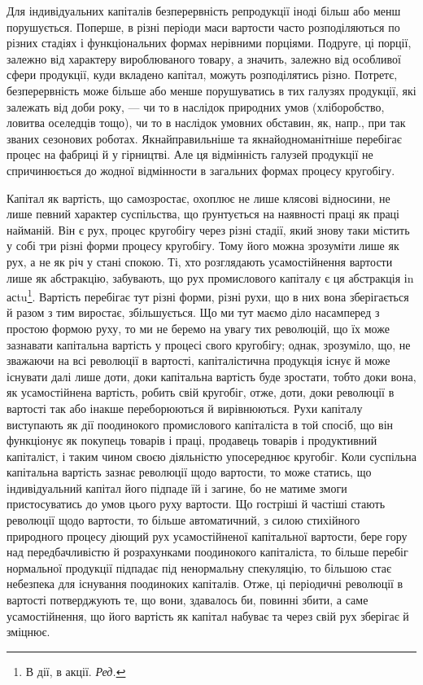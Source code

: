 
Для індивідуальних капіталів безперервність репродукції іноді більш
або менш порушується. Поперше, в різні періоди маси вартости часто
розподіляються по різних стадіях і функціональних формах нерівними
порціями. Подруге, ці порції, залежно від характеру вироблюваного товару,
а значить, залежно від особливої сфери продукції, куди вкладено капітал,
можуть розподілятись різно. Потретє, безперервність може більше або
менше порушуватись в тих галузях продукції, які залежать від доби
року, — чи то в наслідок природних умов (хліборобство, ловитва оселедців
тощо), чи то в наслідок умовних обставин, як, напр., при так званих сезонових
роботах. Якнайправильніше та якнайодноманітніше перебігає процес
на фабриці й у гірництві. Але ця відмінність галузей продукції не спричинюється
до жодної відмінности в загальних формах процесу кругобігу.

Капітал як вартість, що самозростає, охоплює не лише клясові
відносини, не лише певний характер суспільства, що ґрунтується на наявності
праці як праці найманій. Він є рух, процес кругобігу через різні
стадії, який знову таки містить у собі три різні форми процесу кругобігу.
Тому його можна зрозуміти лише як рух, а не як річ у стані спокою.
Ті, хто розглядають усамостійнення вартости лише як абстракцію, забувають,
що рух промислового капіталу є ця абстракція іn асtu\footnote*{
В дії, в акції. \emph{Ред.}
}. Вартість
перебігає тут різні форми, різні рухи, що в них вона зберігається й разом
з тим виростає, збільшується. Що ми тут маємо діло насамперед з простою
формою руху, то ми не беремо на увагу тих революцій, що їх
може зазнавати капітальна вартість у процесі свого кругобігу; однак,
зрозуміло, що, не зважаючи на всі революції в вартості, капіталістична
продукція існує й може існувати далі лише доти, доки капітальна вартість
буде зростати, тобто доки вона, як усамостійнена вартість, робить
свій кругобіг, отже, доти, доки революції в вартості так або інакше
переборюються й вирівнюються. Рухи капіталу виступають як дії поодинокого
промислового капіталіста в той спосіб, що він функціонує як
покупець товарів і праці, продавець товарів і продуктивний капіталіст,
і таким чином своєю діяльністю упосереднює кругобіг. Коли суспільна
капітальна вартість зазнає революції щодо вартости, то може статись, що
індивідуальний капітал його підпаде їй і загине, бо не матиме змоги пристосуватись
до умов цього руху вартости. Що гостріші й частіші стають
революції щодо вартости, то більше автоматичний, з силою стихійного
природного процесу діющий рух усамостійненої капітальної вартости,
бере гору над передбачливістю й розрахунками поодинокого капіталіста,
то більше перебіг нормальної продукції підпадає під ненормальну спекуляцію,
то більшою стає небезпека для існування поодиноких капіталів.
Отже, ці періодичні революції в вартості потверджують те, що вони,
здавалось би, повинні збити, а саме усамостійнення, що його вартість
як капітал набуває та через свій рух зберігає й зміцнює.

